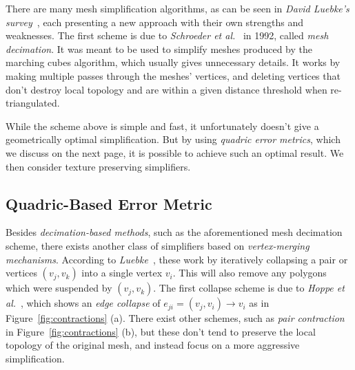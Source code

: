 There are many mesh simplification algorithms, as can be seen in \emph{David Luebke's survey}~\cite{luebke2001developer}, each presenting a new approach with their own strengths and weaknesses. The first scheme is due to \emph{Schroeder et al.}~\cite{schroeder1992decimation} in 1992, called \emph{mesh decimation}. It was meant to be used to simplify meshes produced by the marching cubes algorithm, which usually gives unnecessary details. It works by making multiple passes through the meshes' vertices, and deleting vertices that don't destroy local topology and are within a given distance threshold when re-triangulated.

While the scheme above is simple and fast, it unfortunately doesn't give a geometrically optimal simplification. But by using \emph{quadric error metrics}, which we discuss on the next page, it is possible to achieve such an optimal result. We then consider texture preserving simplifiers.

\subsection{Quadric-Based Error Metric} \label{sec:quadric-based_error_metric}

Besides \emph{decimation-based methods}, such as the aforementioned mesh decimation scheme, there exists another class of simplifiers based on \emph{vertex-merging mechanisms}. According to \emph{Luebke}~\cite{luebke2001developer}, these work by iteratively collapsing a pair or vertices \((v_j, v_k)\) into a single vertex \(v_i\). This will also remove any polygons which were suspended by \((v_j, v_k)\). The first collapse scheme is due to \emph{Hoppe et al.}~\cite{hoppe1993mesh}, which shows an \emph{edge collapse} of \(e_{ji} = (v_j, v_i) \rightarrow v_i\) as in Figure~\ref{fig:contractions} (a). There exist other schemes, such as \emph{pair contraction} in Figure~\ref{fig:contractions} (b), but these don't tend to preserve the local topology of the original mesh, and instead focus on a more aggressive simplification.

